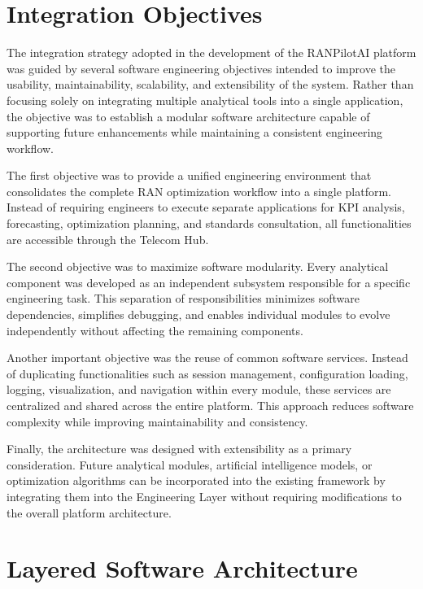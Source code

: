 \section{Integration Objectives}

The integration strategy adopted in the development of the RANPilotAI platform was guided by several software engineering objectives intended to improve the usability, maintainability, scalability, and extensibility of the system. Rather than focusing solely on integrating multiple analytical tools into a single application, the objective was to establish a modular software architecture capable of supporting future enhancements while maintaining a consistent engineering workflow.

The first objective was to provide a unified engineering environment that consolidates the complete RAN optimization workflow into a single platform. Instead of requiring engineers to execute separate applications for KPI analysis, forecasting, optimization planning, and standards consultation, all functionalities are accessible through the Telecom Hub.

The second objective was to maximize software modularity. Every analytical component was developed as an independent subsystem responsible for a specific engineering task. This separation of responsibilities minimizes software dependencies, simplifies debugging, and enables individual modules to evolve independently without affecting the remaining components.

Another important objective was the reuse of common software services. Instead of duplicating functionalities such as session management, configuration loading, logging, visualization, and navigation within every module, these services are centralized and shared across the entire platform. This approach reduces software complexity while improving maintainability and consistency.

Finally, the architecture was designed with extensibility as a primary consideration. Future analytical modules, artificial intelligence models, or optimization algorithms can be incorporated into the existing framework by integrating them into the Engineering Layer without requiring modifications to the overall platform architecture.

\section{Layered Software Architecture}

